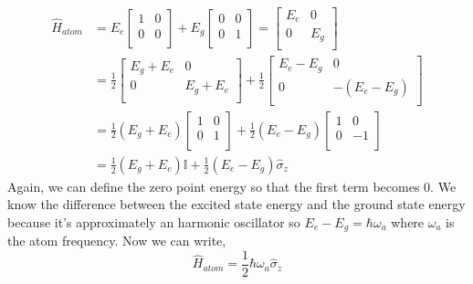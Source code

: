 \documentclass[english, a4paper, 12pt, twoside]{article}
\numberwithin{equation}{section} %
\begin{document}
    \begin{align*} 
        \hat{H}_{atom} &= 
        E_e \begin{bmatrix}
        1 & 0     \\
        0   & 0   \\
        \end{bmatrix}
        + E_g \begin{bmatrix}
        0 & 0     \\
        0   & 1   \\
        \end{bmatrix} = 
        \begin{bmatrix}
        E_e & 0     \\
        0   & E_g   \\
        \end{bmatrix} \\
        &= \frac{1}{2}\begin{bmatrix}
        E_g + E_e & 0          \\
        0         & E_g + E_e  \\
        \end{bmatrix} +
        \frac{1}{2}\begin{bmatrix}
        E_e - E_g & 0          \\
        0         & -(E_e - E_g)  \\
        \end{bmatrix} \\
        &= \frac{1}{2}(E_g + E_e)\begin{bmatrix}
        1 & 0          \\
        0         & 1  \\
        \end{bmatrix} +
        \frac{1}{2}(E_e - E_g)\begin{bmatrix}
        1 & 0          \\
        0         & -1  \\
        \end{bmatrix} \\
        &= \frac{1}{2}(E_g + E_e)\mathbb{I} + \frac{1}{2}(E_e - E_g)\hat{\sigma}_z
    \end{align*}
Again, we can define the zero point energy so that the first term becomes $0$. We know the difference between the excited state energy and the ground state energy because it's approximately an harmonic oscillator so $E_e - E_g = \hbar\omega_a$ where $\omega_a$ is the atom frequency. Now we can write,
\begin{equation}
    \boxed{\hat{H}_{atom} = \frac{1}{2}\hbar\omega_a\hat{\sigma}_z}
\end{equation}
\end{document}
